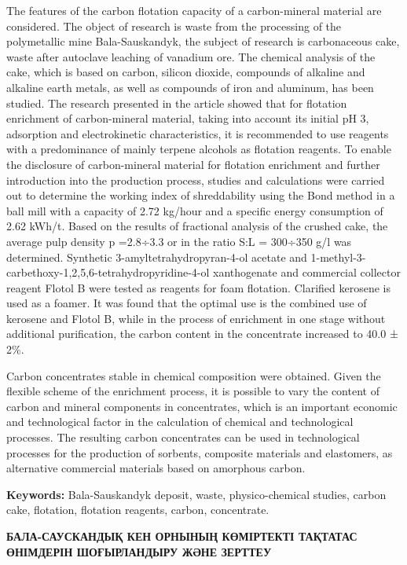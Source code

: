 The features of the carbon flotation capacity of a carbon-mineral
material are considered. The object of research is waste from the
processing of the polymetallic mine Bala-Sauskandyk, the subject of
research is carbonaceous cake, waste after autoclave leaching of
vanadium ore. The chemical analysis of the cake, which is based on
carbon, silicon dioxide, compounds of alkaline and alkaline earth
metals, as well as compounds of iron and aluminum, has been studied. The
research presented in the article showed that for flotation enrichment
of carbon-mineral material, taking into account its initial pH 3,
adsorption and electrokinetic characteristics, it is recommended to use
reagents with a predominance of mainly terpene alcohols as flotation
reagents. To enable the disclosure of carbon-mineral material for
flotation enrichment and further introduction into the production
process, studies and calculations were carried out to determine the
working index of shreddability using the Bond method in a ball mill with
a capacity of 2.72 kg/hour and a specific energy consumption of 2.62
kWh/t. Based on the results of fractional analysis of the crushed cake,
the average pulp density p =2.8÷3.3 or in the ratio S:L = 300÷350 g/l
was determined. Synthetic 3-amyltetrahydropyran-4-ol acetate and
1-methyl-3-carbethoxy-1,2,5,6-tetrahydropyridine-4-ol xanthogenate and
commercial collector reagent Flotol B were tested as reagents for foam
flotation. Clarified kerosene is used as a foamer. It was found that the
optimal use is the combined use of kerosene and Flotol B, while in the
process of enrichment in one stage without additional purification, the
carbon content in the concentrate increased to 40.0 ± 2\%.

Carbon concentrates stable in chemical composition were obtained. Given
the flexible scheme of the enrichment process, it is possible to vary
the content of carbon and mineral components in concentrates, which is
an important economic and technological factor in the calculation of
chemical and technological processes. The resulting carbon concentrates
can be used in technological processes for the production of sorbents,
composite materials and elastomers, as alternative commercial materials
based on amorphous carbon.

{\bfseries Keywords:} Bala-Sauskandyk deposit, waste, physico-chemical
studies, carbon cake, flotation, flotation reagents, carbon,
concentrate.

{\bfseries БАЛА-САУСКАНДЫҚ КЕН ОРНЫНЫҢ КӨМІРТЕКТІ ТАҚТАТАС ӨНІМДЕРІН
ШОҒЫРЛАНДЫРУ ЖӘНЕ ЗЕРТТЕУ}

